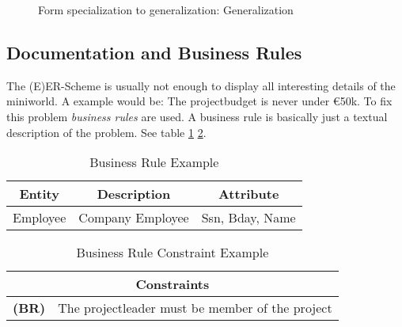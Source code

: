 \begin{figure}[h]
\scriptsize
\centering
{}
\caption{Form specialization to generalization: Generalization}
\label{fig:is:FormSpecializationToGeneralization:Generalization}
\end{figure}

\subsection{Documentation and Business Rules}
The (E)ER-Scheme is usually not enough to display all interesting details of the
miniworld. A example would be: The projectbudget is never under \euro{50k}. To
fix this problem \textit{business rules} are used. A business rule is basically
just a textual description of the problem. See table
\ref{tab:is:buisnessRuleExample}
\ref{tab:is:buisnessRuleConstraintExample}.

\begin{table}[h]
\begin{tabular}{|c|c|c|}
\hline
Entity & Description & Attribute\\
\hline
Employee & Company Employee & Ssn, Bday, Name\\
\hline
\end{tabular}
\caption{Business Rule Example}
\label{tab:is:buisnessRuleExample}
\end{table}

\begin{table}[h]
\begin{tabular}{|l|c|}
\hline
\multicolumn{2}{|c|}{Constraints}\\
\hline
\textbf{(BR)} & The projectleader must be member of the project\\
\hline
\end{tabular}
\caption{Business Rule Constraint Example}
\label{tab:is:buisnessRuleConstraintExample}
\end{table}

